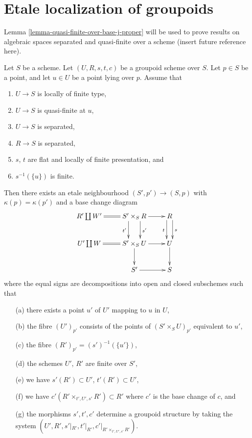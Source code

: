 \section{Etale localization of groupoids}
\label{section-etale-localize}

\noindent
Lemma \ref{lemma-quasi-finite-over-base-j-proper}
will be used to prove results on algebraic spaces
separated and quasi-finite over a scheme (insert future reference here).

\begin{lemma}
\label{lemma-quasi-finite-over-base}
Let $S$ be a scheme.
Let $(U, R, s, t, c)$ be a groupoid scheme over $S$.
Let $p \in S$ be a point, and let $u \in U$ be a point lying over $p$.
Assume that
\begin{enumerate}
\item $U \to S$ is locally of finite type,
\item $U \to S$ is quasi-finite at $u$,
\item $U \to S$ is separated,
\item $R \to S$ is separated,
\item $s$, $t$ are flat and locally of finite presentation, and
\item $s^{-1}(\{u\})$ is finite.
\end{enumerate}
Then there exists an etale neighbourhood $(S', p') \to (S, p)$ with
$\kappa(p) = \kappa(p')$ and a base change diagram
$$
\xymatrix{
R' \coprod W'
\ar@{=}[r] &
S' \times_S R
\ar[r] \ar@<2ex>[d]^{s'} \ar@<-2ex>[d]_{t'} &
R \ar@<1ex>[d]^s \ar@<-1ex>[d]_t \\
U' \coprod W
\ar@{=}[r] &
S' \times_S U
\ar[r] \ar[d] &
U \ar[d] \\
 &
S' \ar[r] &
S
}
$$
where the equal signs are decompositions into open and closed
subschemes such that
\begin{enumerate}
\item[(a)] there exists a point $u'$ of $U'$ mapping to $u$ in $U$,
\item[(b)] the fibre $(U')_{p'}$ consists of the points of
$(S' \times_S U)_{p'}$ equivalent to $u'$,
\item[(c)] the fibre $(R')_{p'} = (s')^{-1}(\{u'\})$,
\item[(d)] the schemes $U'$, $R'$ are finite over $S'$,
\item[(e)] we have $s'(R') \subset U'$, $t'(R') \subset U'$,
\item[(f)] we have
$c'(R' \times_{t', U', s'} R') \subset R'$
where $c'$ is the base change of $c$, and
\item[(g)] the morphisms $s', t', c'$ determine a groupoid structure
by taking the system
$(U', R', s'|_{R'}, t'|_{R'}, c'|_{R' \times_{t', U', s'} R'})$.
\end{enumerate}
\end{lemma}

